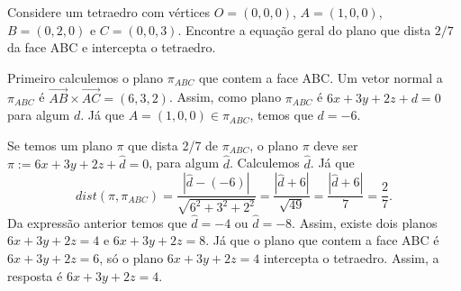 \documentclass[11pt]{exam}
\begin{document}
\begin{questions}
		\question[10] Considere um tetraedro com vértices 
		$O=(0,0,0)$, $A=(1,0,0)$, $B=(0,2,0)$ e $C=(0,0,3)$.
		Encontre a equação geral do plano que dista $2/7$ 
		da face ABC e intercepta o tetraedro.
		\begin{solution}
			Primeiro calculemos o plano $\pi_{ABC}$ que contem a face ABC.
			Um vetor normal a $\pi_{ABC}$ é $\overrightarrow{AB} \times \overrightarrow{AC}=(6,3,2)$.
			Assim, como plano  $\pi_{ABC}$ é $6x+3y+2z+d=0$ para algum $d$. 
			Já que $A=(1,0,0) \in \pi_{ABC}$, temos que $d=-6$.
			
			Se temos um plano $\pi$ que dista 2/7 de $\pi_{ABC}$, 
			o plano $\pi$ deve ser $\pi:=6x+3y+2z+\widehat{d}=0$, 
			para algum $\widehat{d}$. Calculemos $\widehat{d}$. 
			Já que 
			$$dist(\pi,\pi_{ABC})=
			\frac{|\widehat{d}-(-6)|}{\sqrt{6^2+3^{2}+2^2}}=
			\frac{|\widehat{d}+6|}{\sqrt{49}}=
			\frac{|\widehat{d}+6|}{7}=\frac{2}{7}.$$
			Da expressão anterior temos que $\widehat{d}=-4$ ou 
			$\widehat{d}=-8$. Assim, existe dois planos 
			$6x+3y+2z=4$
			e 
			$6x+3y+2z=8$. Já que 
			o plano que contem a face ABC é 
			$6x+3y+2z=6$, só o plano $6x+3y+2z=4$ intercepta o tetraedro.
			Assim, a resposta é  $6x+3y+2z=4$.
		\end{solution}
	\end{questions}
\end{document}
